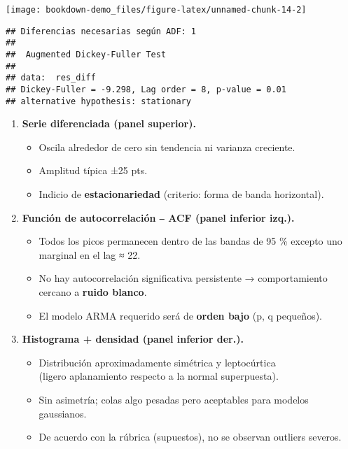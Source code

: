 \documentclass[
  11pt,
]{book}
\providecommand{\tightlist}{%
  \setlength{\itemsep}{0pt}\setlength{\parskip}{0pt}}
\begin{document}
\begin{center}\texttt{[image: bookdown-demo\_files/figure-latex/unnamed-chunk-14-2]} \end{center}

\begin{verbatim}
## Diferencias necesarias según ADF: 1 
## 
##  Augmented Dickey-Fuller Test
## 
## data:  res_diff
## Dickey-Fuller = -9.298, Lag order = 8, p-value = 0.01
## alternative hypothesis: stationary
\end{verbatim}

\begin{enumerate}
\def\labelenumi{\arabic{enumi}.}
\tightlist
\item
  \textbf{Serie diferenciada (panel superior).}

  \begin{itemize}
  \tightlist
  \item
    Oscila alrededor de cero sin tendencia ni varianza creciente.\\
  \item
    Amplitud típica ±25 pts.\\
  \item
    Indicio de \textbf{estacionariedad} (criterio: forma de banda horizontal).
  \end{itemize}
\item
  \textbf{Función de autocorrelación ‒ ACF (panel inferior izq.).}

  \begin{itemize}
  \tightlist
  \item
    Todos los picos permanecen dentro de las bandas de 95 \% excepto uno
    marginal en el lag ≈ 22.\\
  \item
    No hay autocorrelación significativa persistente → comportamiento cercano a \textbf{ruido blanco}.\\
  \item
    El modelo ARMA requerido será de \textbf{orden bajo} (p, q pequeños).
  \end{itemize}
\item
  \textbf{Histograma + densidad (panel inferior der.).}

  \begin{itemize}
  \tightlist
  \item
    Distribución aproximadamente simétrica y leptocúrtica\\
    (ligero aplanamiento respecto a la normal superpuesta).\\
  \item
    Sin asimetría; colas algo pesadas pero aceptables para modelos
    gaussianos.\\
  \item
    De acuerdo con la rúbrica (supuestos), no se observan outliers severos.
  \end{itemize}
\end{enumerate}
\end{document}
